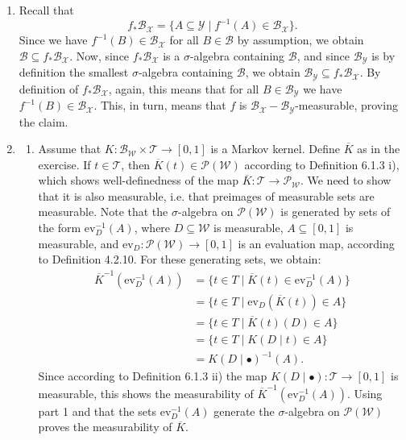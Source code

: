 \begin{gradedsolution}
  \begin{enumerate}
    \item Recall that
      \begin{equation}
	f_* \mathcal{B}_{\mathcal{X}} = \{A \subseteq \mathcal{Y} \mid f^{-1}(A) \in \mathcal{B}_{\mathcal{X}}\}.
	\label{eq:recall_definition}
      \end{equation}
      Since we have $f^{-1}(B) \in \mathcal{B}_{\mathcal{X}}$ for all $B \in \mathcal{B}$ by assumption, we obtain $\mathcal{B} \subseteq f_* \mathcal{B}_{\mathcal{X}}$.
      Now, since $f_* \mathcal{B}_{\mathcal{X}}$ is a $\sigma$-algebra containing $\mathcal{B}$, and since $\mathcal{B}_{\mathcal{Y}}$ is by definition the smallest $\sigma$-algebra containing $\mathcal{B}$, we obtain $\mathcal{B}_{\mathcal{Y}} \subseteq f_* \mathcal{B}_{\mathcal{X}}$.
      By definition of $f_* \mathcal{B}_{\mathcal{X}}$, again, this means that for all $B \in \mathcal{B}_{\mathcal{Y}}$ we have $f^{-1}(B) \in \mathcal{B}_{\mathcal{X}}$.
      This, in turn, means that $f$ is $\mathcal{B}_{\mathcal{X}}-\mathcal{B}_{\mathcal{Y}}$-measurable, proving the claim.
    \item 
      \begin{enumerate}
	\item Assume that $K: \mathcal{B}_{\mathcal{W}} \times \mathcal{T} \to [0,1]$ is a Markov kernel. 
	  Define $\overline{K}$ as in the exercise. 
	  If $t \in \mathcal{T}$, then $\overline{K}(t) \in \mathcal{P}(\mathcal{W})$ according to Definition 6.1.3 i), which shows well-definedness of the map $\overline{K}: \mathcal{T} \to \mathcal{P}_{\mathcal{W}}$.
	  We need to show that it is also measurable, i.e. that preimages of measurable sets are measurable.
	  Note that the $\sigma$-algebra on $\mathcal{P}(\mathcal{W})$ is generated by sets of the form $\text{ev}_D^{-1}(A)$, where $D \subseteq \mathcal{W}$ is measurable, $A \subseteq [0,1]$ is measurable, and $\text{ev}_D: \mathcal{P(\mathcal{W})} \to [0,1]$ is an evaluation map, according to Definition 4.2.10.
	  For these generating sets, we obtain:
	  \begin{align*}
	    \overline{K}^{-1}(\text{ev}_D^{-1}(A)) & = \{ t \in T \mid \overline{K}(t) \in \text{ev}_D^{-1}(A)\} \\
	    & = \{t \in T \mid \text{ev}_D(\overline{K}(t)) \in A\} \\
	    & = \{t \in T \mid \overline{K}(t)(D) \in A\} \\
	    & = \{t \in T \mid K(D \mid t) \in A\} \\
	    & = K(D \mid \bullet)^{-1}(A).
	    \label{eq:derivation_measurable}
	  \end{align*}
	Since according to Definition 6.1.3 ii) the map $K(D \mid \bullet): \mathcal{T} \to [0,1]$ is measurable, this shows the measurability of $\overline{K}^{-1}(\text{ev}_D^{-1}(A))$.
	Using part 1 and that the sets $\text{ev}_D^{-1}(A)$ generate the $\sigma$-algebra on $\mathcal{P}(\mathcal{W})$ proves the measurability of $\overline{K}$.


\end{enumerate}
\end{enumerate}
\end{gradedsolution}
